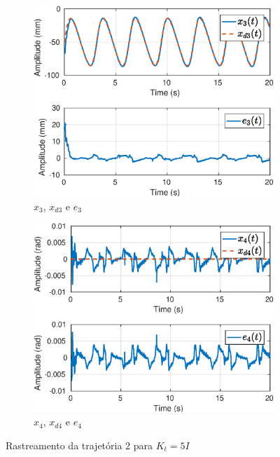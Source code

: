 \begin{figure}[H]
\begin{subfigure}{.5\textwidth}
  \centering
  \includegraphics[width=\linewidth]{./img/traj_2_k5/x3.eps}
  \caption{$x_3$, $x_{d3}$ e $e_3$}
  \label{fig:sub1}
\end{subfigure}%
\begin{subfigure}{.5\textwidth}
  \centering
  \includegraphics[width=\linewidth]{./img/traj_2_k5/x4.eps}
  \caption{$x_4$, $x_{d4}$ e $e_4$}
  \label{fig:sub2}
\end{subfigure}
\caption{Rastreamento da trajetória 2 para ${K}_t = 5 {I}$}
\label{fig:test}
\end{figure}

